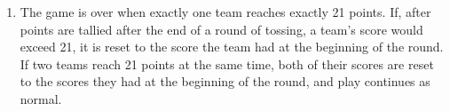 \documentclass[a4paper]{article}
\begin{document}
\begin{enumerate}
\item The game is over when exactly one team reaches exactly 21 points. If, after points are tallied after the end of a round of tossing, a team's score would exceed 21, it is reset to the score the team had at the beginning of the round. If two teams reach 21 points at the same time, both of their scores are reset to the scores they had at the beginning of the round, and play continues as normal.
\end{enumerate}
\end{document}
